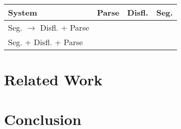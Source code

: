 \documentclass[11pt,letterpaper]{article}
\begin{document}
\begin{table}
    \centering
    \small
    \begin{tabular}{l|rrr}
        System & Parse & Disfl. & Seg. \\
        \hline \hline
        Seg. $\rightarrow$ Disfl. + Parse & & & \\
        Seg. + Disfl. + Parse  & & & \\
    \end{tabular}
\end{table}

\clearpage

\section{Related Work}

\section{Conclusion}


\end{document}
